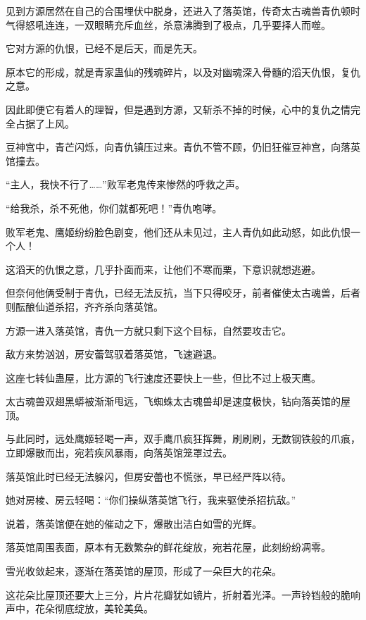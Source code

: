 
\begin{this_body}



见到方源居然在自己的合围埋伏中脱身，还进入了落英馆，传奇太古魂兽青仇顿时气得怒吼连连，一双眼睛充斥血丝，杀意沸腾到了极点，几乎要择人而噬。

它对方源的仇恨，已经不是后天，而是先天。

原本它的形成，就是青家蛊仙的残魂碎片，以及对幽魂深入骨髓的滔天仇恨，复仇之意。

因此即便它有着人的理智，但是遇到方源，又斩杀不掉的时候，心中的复仇之情完全占据了上风。

豆神宫中，青芒闪烁，向青仇镇压过来。青仇不管不顾，仍旧狂催豆神宫，向落英馆撞去。

“主人，我快不行了……”败军老鬼传来惨然的呼救之声。

“给我杀，杀不死他，你们就都死吧！”青仇咆哮。

败军老鬼、鹰姬纷纷脸色剧变，他们还从未见过，主人青仇如此动怒，如此仇恨一个人！

这滔天的仇恨之意，几乎扑面而来，让他们不寒而栗，下意识就想逃避。

但奈何他俩受制于青仇，已经无法反抗，当下只得咬牙，前者催使太古魂兽，后者则酝酿仙道杀招，齐齐杀向落英馆。

方源一进入落英馆，青仇一方就只剩下这个目标，自然要攻击它。

敌方来势汹汹，房安蕾驾驭着落英馆，飞速避退。

这座七转仙蛊屋，比方源的飞行速度还要快上一些，但比不过上极天鹰。

太古魂兽双翅黑蟒被渐渐甩远，飞蜘蛛太古魂兽却是速度极快，钻向落英馆的屋顶。

与此同时，远处鹰姬轻喝一声，双手鹰爪疯狂挥舞，刷刷刷，无数钢铁般的爪痕，立即爆散而出，宛若疾风暴雨，向落英馆笼罩过去。

落英馆此时已经无法躲闪，但房安蕾也不慌张，早已经严阵以待。

她对房棱、房云轻喝：“你们操纵落英馆飞行，我来驱使杀招抗敌。”

说着，落英馆便在她的催动之下，爆散出洁白如雪的光辉。

落英馆周围表面，原本有无数繁杂的鲜花绽放，宛若花屋，此刻纷纷凋零。

雪光收敛起来，逐渐在落英馆的屋顶，形成了一朵巨大的花朵。

这花朵比屋顶还要大上三分，片片花瓣犹如镜片，折射着光泽。一声铃铛般的脆响声中，花朵彻底绽放，美轮美奂。


\end{this_body}
